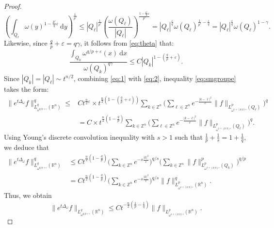 \documentclass[12pt, letterpaper]{amsart}
\theoremstyle{definition}
\theoremstyle{remark}
\numberwithin{equation}{section}
\begin{document}
\begin{proof}
\begin{equation}
        \left ( \int_{Q_{\ell}} \omega(y)^{1-\frac{p'}{q}\varepsilon}\ \mathrm{d} y \right )^{\frac{1}{p'}} \leq  |Q_\ell|^{\frac{1}{p'}} \left( \frac{\omega(Q_\ell)}{|Q_\ell|} \right)^{\frac{1-\frac{p'}{q}\varepsilon}{p'}}=  |Q_\ell|^{\frac{\varepsilon}{q}} \omega(Q_\ell)^{\frac{1}{p'}-\frac{\varepsilon}{q}}= |Q_\ell|^{\frac{\varepsilon}{q}} \omega(Q_\ell)^{1-\gamma}.
    \end{equation}
    Likewise, since $\frac{q}{p} + \varepsilon = q \gamma$, it follows from \eqref{eq:theta} that:
    \begin{equation}\label{eq:2}
        \frac{\int_{Q_{k}} \omega^{q/p+\varepsilon}(x) \ \mathrm{d}x}{\omega(Q_k)^{q\gamma}} \leq C |Q_k|^{1-(\frac{q}{p}+\varepsilon)}.
    \end{equation}
    Since $|Q_k| = |Q_\ell| \sim t^{n/2}$, combining \eqref{eq:1} with \eqref{eq:2}, inequality \eqref{eq:smgroupe} takes the form:
    \begin{align*}
        \| e^{t\Delta_\omega} f \|^q_{L^q_{{\omega}^{q/p+\varepsilon}}(\mathbb{R}^n)} \leq &C t^{\frac{n}{2} \varepsilon} \times t^{\frac{n}{2}(1-(\frac{q}{p}+\varepsilon))} \sum_{k\in \mathbb{Z}^n}  \bigg ( \sum_{\ell\in \mathbb{Z}^n} e^{-\frac{|k-\ell|^2}{c}}   \| f \|_{L^p_{\omega^{1+(p/q)\varepsilon}}(Q_{\ell})} \bigg )^q 
        \\& = C \times t^{\frac{n}{2}(1-\frac{q}{p})} \sum_{k\in \mathbb{Z}^n}  \bigg ( \sum_{\ell\in \mathbb{Z}^n} e^{-\frac{|k-\ell|^2}{c}}   \| f \|_{L^p_{\omega^{1+(p/q)\varepsilon}}(Q_{\ell})} \bigg )^q. 
    \end{align*}
    Using Young's discrete convolution inequality with $s>1$ such that $\frac{1}{p}+\frac{1}{s}=1+\frac{1}{q}$, we deduce that 
    \begin{align*}
        \| e^{t\Delta_\omega} f \|^q_{L^q_{{\omega}^{q/p+\varepsilon}}(\mathbb{R}^n)} &\leq C t^{\frac{n}{2}(1-\frac{q}{p})} \bigg ( \sum_{k\in \mathbb{Z}^n} e^{-s\frac{|k|^2}{c}} \bigg )^{q/s} \bigg ( \sum_{k\in \mathbb{Z}^n}  \|f \|^p_{L^p_{\omega^{1+(p/q)\varepsilon}}(Q_{k})} \bigg )^{q/p} \\&= C t^{\frac{n}{2}(1-\frac{q}{p})} \bigg( \sum_{k\in \mathbb{Z}^n} e^{-s\frac{|k|^2}{c}} \bigg )^{q/s} \|f \|^q_{L^p_{\omega^{1+(p/q)\varepsilon}}(\mathbb{R}^n)}.
    \end{align*}
     Thus, we obtain
    $$\| e^{t\Delta_\omega} f \|_{L^q_{{\omega}^{q/p+\varepsilon}}(\mathbb{R}^n)} \leq C t^{-\frac{n}{2}(\frac{1}{p}-\frac{1}{q})} \|  f \|_{L^p_{\omega^{1+(p/q)\varepsilon}}(\mathbb{R}^n)}.$$
\end{proof}
\end{document}
